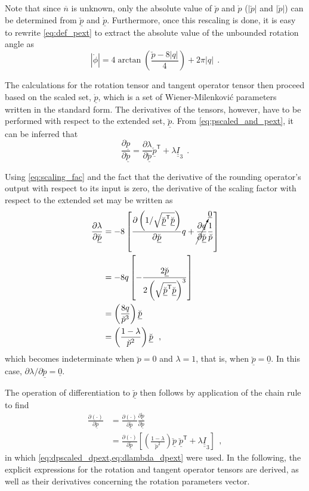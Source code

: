 \documentclass[12pt,a4paper,oneside,english]{abntex2} %
\newcommand{\vect}[1]{\underline{#1}}
\newcommand{\uvec}[1]{\overline{#1}}
\newcommand{\del}[2]{\frac{\partial#1}{\partial#2}}
\def\tens#1{\underline{\underline{#1}}}
\def\lb{\left[}
\def\rb{\right]}
\def\lp{\left(}
\def\rp{\right)}
\def\T{\mathsf{T}}
\def\Ithree{\tens{I}_3}
\def\p{\vect{p}}
\def\zv{\vect{0}}
\def\phiscl{\mathring{\phi}}
\def\pscaled{\mathring{\p}}
\def\pscalednorm{\mathring{p}}
\def\pext{\breve{\p}}
\def\pextnorm{\breve{p}}
\begin{document}
\begin{apendicesenv}
Note that since $\uvec{n}$ is unknown, only the absolute value of $\pextnorm$ and $\pscalednorm$ ($|\pextnorm|$ and $|\pscalednorm|$) can be determined from $\pext$ and $\pscaled$. Furthermore, once this rescaling is done, it is easy to rewrite \cref{eq:def_pext} to extract the absolute value of the unbounded rotation angle as
\begin{equation}
     |\phiscl| = 4\arctan{\lp\frac{\pextnorm-8|q|}{4}\rp} + 2\pi|q| \ \ .
    \label{eq:phi2}
\end{equation}

The calculations for the rotation tensor and tangent operator tensor then proceed based on the scaled set, $\pscaled$, which is a set of Wiener-Milenkovi\'{c} parameters written in the standard form. The derivatives of the tensors, however, have to be performed with respect to the extended set, $\pext$. From \cref{eq:pscaled_and_pext}, it can be inferred that
\begin{equation}
    \del{\pscaled}{\pext} = \del{\lambda}{\pext} \pext^\T + \lambda\Ithree \ \ .
    \label{eq:dpscaled_dpext}
\end{equation}

Using \cref{eq:scaling_fac} and the fact that the derivative of the rounding operator's output with respect to its input is zero, the derivative of the scaling factor with respect to the extended set may be written as
\begin{align}
    \del{\lambda}{\pext} &= -8\lb \del{\lp1/\sqrt{\pext^\T\pext}\rp}{\pext}q + \cancelto{\zv}{\del{q}{\pext}}\frac{1}{\pextnorm} \rb
    \nonumber \\
     &= -8q\lb-\frac{2\pext}{2\lp\sqrt{\pext^\T\pext}\rp^3}\rb
     \nonumber \\
     &= \lp\frac{8q}{\pextnorm^3}\rp\pext
     \nonumber \\
     &= \lp\frac{1-\lambda}{\pextnorm^2}\rp \pext   \ \ ,
    \label{eq:dlambda_dpext}
\end{align}
which becomes indeterminate when $\pextnorm = 0$ and $\lambda = 1$, that is, when $\pext = \zv$. In this case, $\partial\lambda/\partial\pext = \zv$.

The operation of differentiation to $\pext$ then follows by application of the chain rule to find
\begin{align}
    \del{\lp\cdot\rp}{\pext} &= \del{\lp\cdot\rp}{\pscaled} \del{\pscaled}{\pext} 
    \nonumber \\
    &= \del{\lp\cdot\rp}{\pscaled} \lb \lp\frac{1-\lambda}{\pextnorm^2}\rp \pext\;\pext^\T + \lambda\Ithree \rb \ \ ,
    \label{eq:dpext}
\end{align}
in which \cref{eq:dpscaled_dpext,eq:dlambda_dpext} were used. In the following, the explicit expressions for the rotation and tangent operator tensors are derived, as well as their derivatives concerning the rotation parameters vector.


\end{apendicesenv}
\end{document}
